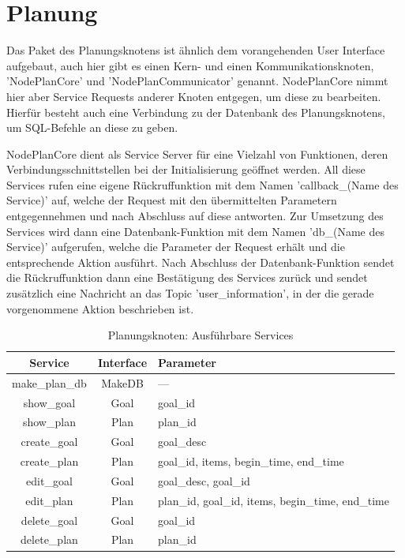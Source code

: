 \FloatBarrier
\section{Planung}

Das Paket des Planungsknotens ist ähnlich dem vorangehenden User Interface aufgebaut, auch hier gibt es einen Kern- und einen Kommunikationsknoten, 'NodePlanCore' und 'NodePlanCommunicator' genannt. NodePlanCore nimmt hier aber Service Requests anderer Knoten entgegen, um diese zu bearbeiten. Hierfür besteht auch eine Verbindung zu der Datenbank des Planungsknotens, um SQL-Befehle an diese zu geben.

NodePlanCore dient als Service Server für eine Vielzahl von Funktionen, deren Verbindungsschnittstellen bei der Initialisierung geöffnet werden. All diese Services rufen eine eigene Rückruffunktion mit dem Namen 'callback\_(Name des Service)' auf, welche der Request mit den übermittelten Parametern entgegennehmen und nach Abschluss auf diese antworten. Zur Umsetzung des Services wird dann eine Datenbank-Funktion mit dem Namen 'db\_(Name des Service)' aufgerufen, welche die Parameter der Request erhält und die entsprechende Aktion ausführt. Nach Abschluss der Datenbank-Funktion sendet die Rückruffunktion dann eine Bestätigung des Services zurück und sendet zusätzlich eine Nachricht an das Topic 'user\_information', in der die gerade vorgenommene Aktion beschrieben ist.

\begin{table}[h]
\begin{center}
\begin{tabular}{| c | c | l |}
  \hline
  Service        & Interface & Parameter                                         \\
  \hline
  \hline
  make\_plan\_db & MakeDB    & ---                                               \\
  show\_goal     & Goal      & goal\_id                                          \\
  show\_plan     & Plan      & plan\_id                                          \\
  create\_goal   & Goal      & goal\_desc                                        \\
  create\_plan   & Plan      & goal\_id, items, begin\_time, end\_time           \\
  edit\_goal     & Goal      & goal\_desc, goal\_id                              \\
  edit\_plan     & Plan      & plan\_id, goal\_id, items, begin\_time, end\_time \\
  delete\_goal   & Goal      & goal\_id                                          \\
  delete\_plan   & Plan      & plan\_id                                          \\
  \hline
\end{tabular}
\caption{Planungsknoten: Ausführbare Services}
\end{center}
\end{table}


